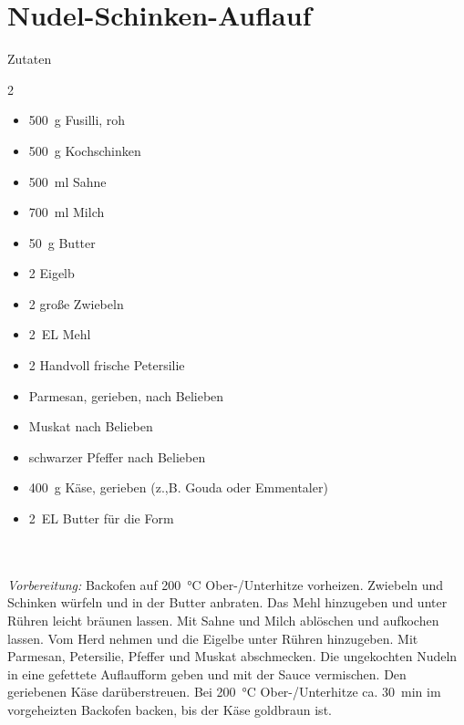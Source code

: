 \section*{Nudel-Schinken-Auflauf}
\ihead{}\ohead{}
\cfoot{}
{\Large Zutaten}
\begin{multicols}{2}
\begin{itemize}
\item \SI{500}{g} Fusilli, roh
\item \SI{500}{g} Kochschinken
\item \SI{500}{ml} Sahne
\item \SI{700}{ml} Milch
\item \SI{50}{g} Butter
\item \num{2} Eigelb
\item \num{2} große Zwiebeln
\item \SI{2}{EL} Mehl
\item \num{2} Handvoll frische Petersilie
\item Parmesan, gerieben, nach Belieben
\item Muskat nach Belieben
\item schwarzer Pfeffer nach Belieben
\item \SI{400}{g} Käse, gerieben (z.,B. Gouda oder Emmentaler)
\item \SI{2}{EL} Butter für die Form
\end{itemize}
\end{multicols}
\\
\\
\textit{Vorbereitung:} Backofen auf \SI{200}{\celsius} Ober-/Unterhitze vorheizen.
Zwiebeln und Schinken würfeln und in der Butter anbraten.
Das Mehl hinzugeben und unter Rühren leicht bräunen lassen.
Mit Sahne und Milch ablöschen und aufkochen lassen.
Vom Herd nehmen und die Eigelbe unter Rühren hinzugeben.
Mit Parmesan, Petersilie, Pfeffer und Muskat abschmecken.
Die ungekochten Nudeln in eine gefettete Auflaufform geben und mit der Sauce vermischen.
Den geriebenen Käse darüberstreuen.
Bei \SI{200}{\celsius} Ober-/Unterhitze ca. \SI{30}{min} im vorgeheizten Backofen backen, bis der Käse goldbraun ist.
